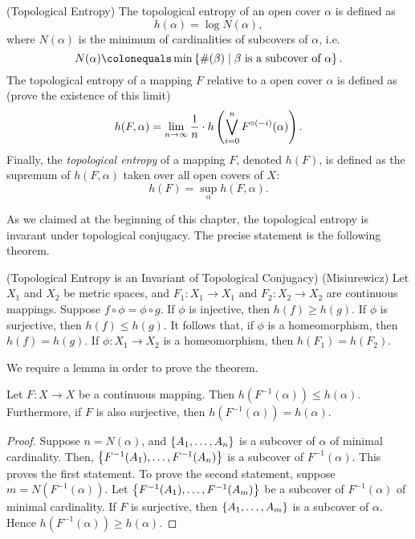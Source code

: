 \documentclass[12pt,twoside,draft]{book}
\begin{document}
\begin{definition}
  (Topological Entropy)
  The topological entropy of an open cover $\alpha$ is defined as
  \begin{equation*}
    h(\alpha) = \log N(\alpha),
  \end{equation*}
  where $N(\alpha)$ is the minimum of cardinalities of subcovers of $\alpha$, i.e.
  \begin{equation*}
    N(\alpha) \ceq \min\setst{ \#(\beta) }{ \beta \mbox{ is a subcover of } \alpha}.
  \end{equation*}
  The topological entropy of a mapping $F$ relative to a open cover $\alpha$ is defined as (prove the existence of this limit)
  \begin{equation*}
    h(F,\alpha) = \lim\limits_{n \to \infty} \frac{1}{n} \cdot h\left (  \bigvee\limits_{i=0}^n F^{\circ (-i)}(\alpha)  \right ).
  \end{equation*}
  Finally, the \textit{topological entropy} of a mapping $F$, denoted $h(F)$, is defined as the supremum of $h(F, \alpha)$ taken over all open covers of $X$:
  \begin{equation*}
    h(F) = \sup\limits_\alpha h(F,\alpha).
  \end{equation*}
  \label{defn:t-entropy}
\end{definition}

As we claimed at the beginning of this chapter, the topological entropy is invarant under topological conjugacy.
The precise statement is the following theorem.
\begin{theorem}
  (Topological Entropy is an Invariant of Topological Conjugacy)
  (Misiurewicz)
  Let $X_1$ and $X_2$ be metric spaces, and $F_1: X_1 \to X_1$ and $F_2: X_2 \to X_2$ are continuous mappings.
  Suppose $f\circ \phi = \phi \circ g$.
  If $\phi$ is injective, then $h(f) \geq h(g)$.
  If $\phi$ is surjective, then $h(f) \leq h(g)$.
  It follows that, if $\phi$ is a homeomorphism, then $h(f) = h(g)$.
  If $\phi: X_1 \to X_2$ is a homeomorphism, then $h(F_1) = h(F_2)$.
  \label{thm:t-ent-conj}
\end{theorem}
We require a lemma in order to prove the theorem.

\begin{lemma}
  Let $F: X\to X$ be a continuous mapping.
  Then $h(F^{-1}(\alpha)) \leq h(\alpha)$.
  Furthermore, if $F$ is also surjective, then $h(F^{-1}(\alpha)) = h(\alpha)$.
  \begin{proof}
    Suppose $n = N(\alpha)$, and $\left \{ A_1, \ldots, A_{n} \right \}$ is a subcover of $\alpha$ of minimal cardinality.
    Then, $\left \{ F^{-1}(A_1), \ldots, F^{-1}(A_{n}) \right \}$ is a subcover of $F^{-1}(\alpha)$.
    This proves the first statement.
    To prove the second statement, suppose $m = N(F^{-1}(\alpha))$.
    Let $\left \{ F^{-1}(A_1), \ldots, F^{-1}(A_{m}) \right \}$ be a subcover of $F^{-1}(\alpha)$ of minimal cardinality.
    If $F$ is surjective, then $\left \{ A_1, \ldots, A_{m} \right \}$ is a subcover of $\alpha$.
    Hence $h(F^{-1}(\alpha)) \geq h(\alpha)$.
  \end{proof}

\end{lemma}
\end{document}
